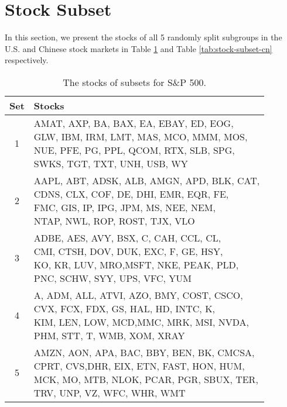 \documentclass[sigconf]{acmart}
\begin{document}
\section{Stock Subset}
\label{app:stock-subset}
In this section, we present the stocks of all 5 randomly split subgroups in the U.S. and Chinese stock markets in Table \ref{tab:stock-subset-us} and Table \ref{tab:stock-subset-cn} respectively.
\begin{table}[htp]
	\centering
	\small
	\begin{tabular}{@{} c @{} || l  @{}}
		\toprule
		Set & Stocks \\\midrule\midrule
		1 & \makecell[l]{AMAT, AXP, BA, BAX, EA, EBAY, ED, EOG,\\
        GLW, IBM, IRM, LMT, MAS, MCO, MMM, MOS,\\
        NUE, PFE, PG, PPL, QCOM, RTX, SLB, SPG,\\
        SWKS, TGT, TXT, UNH, USB, WY} \\ \midrule
		2 & \makecell[l]{AAPL, ABT, ADSK, ALB, AMGN, APD, BLK, CAT,\\
        CDNS, CLX, COF, DE, DHI, EMR, EQR, FE,\\
        FMC, GIS, IP, IPG, JPM, MS, NEE, NEM,\\
        NTAP, NWL, ROP, ROST, TJX, VLO} \\ \midrule
		3 & \makecell[l]{ADBE, AES, AVY, BSX, C, CAH, CCL, CL,\\CMI, CTSH, DOV, DUK, EXC, F, GE, HSY,\\
        KO, KR, LUV, MRO,MSFT, NKE, PEAK, PLD,\\
        PNC, SCHW, SYY, UPS, VFC, YUM} \\ \midrule
		4 & \makecell[l]{A, ADM, ALL, ATVI, AZO, BMY, COST, CSCO,\\
        CVX, FCX, FDX, GS, HAL, HD, INTC, K,\\
        KIM, LEN, LOW, MCD,MMC, MRK, MSI, NVDA,\\
        PHM, STT, T, WMB, XOM, XRAY} \\ \midrule
		5 & \makecell[l]{AMZN, AON, APA, BAC, BBY, BEN, BK, CMCSA,\\
        CPRT, CVS,DHR, EIX, ETN, FAST, HON, HUM,\\
        MCK, MO, MTB, NLOK, PCAR, PGR, SBUX, TER,\\
        TRV, UNP, VZ, WFC, WHR, WMT} \\ \midrule
		
	\end{tabular}
		\caption{The stocks of subsets for S\&P 500.}
	\label{tab:stock-subset-us}
\end{table}
\end{document}
